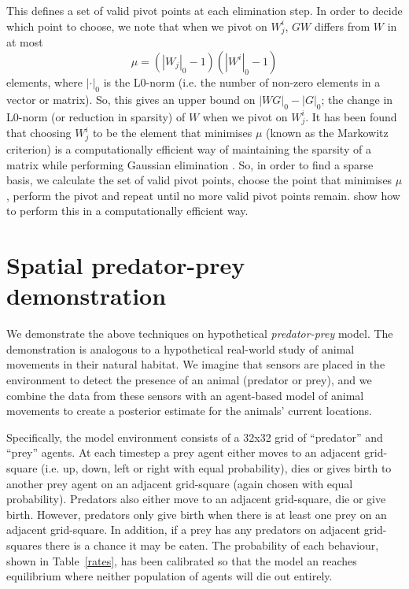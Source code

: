 \documentclass{article}
\begin{document}
This defines a set of valid pivot points at each elimination step. In order to decide which point to choose, we note that when we pivot on $W^i_j$, $GW$ differs from $W$ in at most 
\[
\mu = (\left|W_j\right|_0-1)(\left|W^i\right|_0-1)
\]
 elements, where $\left|\cdot\right|_0$ is the L0-norm (i.e. the number of non-zero elements in a vector or matrix). So, this gives an upper bound on $\left|WG\right|_0 - \left|G\right|_0$; the change in L0-norm (or reduction in sparsity) of $W$ when we pivot on $W^i_j$. It has been found that choosing $W^i_j$ to be the element that minimises $\mu$ (known as the Markowitz criterion) is a computationally efficient way of maintaining the sparsity of a matrix while performing Gaussian elimination \citep*{markowitz1957elimination, suhl1990computing, maros2002computational}. So, in order to find a sparse basis, we calculate the set of valid pivot points, choose the point that minimises $\mu$, perform the pivot and repeat until no more valid pivot points remain. \citet{suhl1990computing} show how to perform this in a computationally efficient way.

\section{Spatial predator-prey demonstration}\label{sec:demonstration}

We demonstrate the above techniques on hypothetical \textit{predator-prey} model. The demonstration is analogous to a hypothetical real-world study of animal movements in their natural habitat. We imagine that sensors are placed in the environment to detect the presence of an animal (predator or prey), and we combine the data from these sensors with an agent-based model of animal movements to create a posterior estimate for the animals' current locations. %

Specifically, the model environment consists of a 32x32 grid of ``predator'' and ``prey'' agents. At each timestep a prey agent either moves to an adjacent grid-square (i.e. up, down, left or right with equal probability), dies or gives birth to another prey agent on an adjacent grid-square (again chosen with equal probability). Predators also either move to an adjacent grid-square, die or give birth. However, predators only give birth when there is at least one prey on an adjacent grid-square. In addition, if a prey has any predators on adjacent grid-squares there is a chance it may be eaten. The probability of each behaviour, shown in Table~\ref{rates}, has been calibrated so that the model an reaches equilibrium where neither population of agents will die out entirely.
\end{document}
